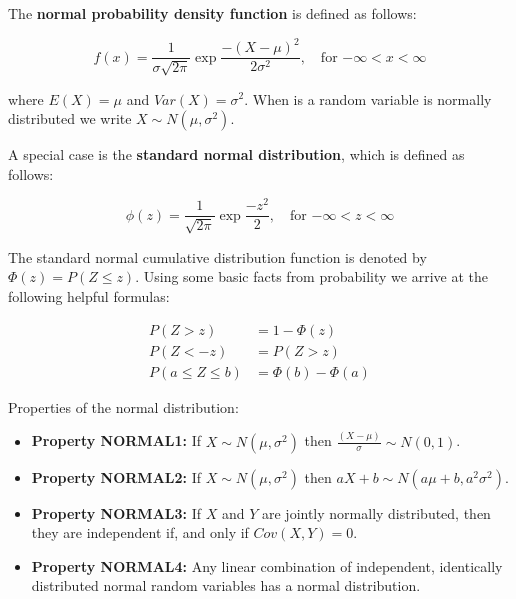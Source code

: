 \documentclass[11pt]{article}
\begin{document}
The \textbf{normal probability density function} is defined as follows:

\begin{equation*}
f(x) = \frac{1}{\sigma \sqrt{2\pi}} \exp{\frac{-(X-\mu)^{2}}{2\sigma^{2}}}, \quad \mbox{for $-\infty < x < \infty$}
\end{equation*}

where $E(X) = \mu$ and $Var(X) = \sigma^{2}$. When is a random variable is normally distributed we write 
$X \sim N(\mu, \sigma^{2})$.

\vspace{2mm}

A special case is the \textbf{standard normal distribution}, which is defined as follows:

\begin{equation*}
\phi(z) = \frac{1}{\sqrt{2\pi}} \exp{\frac{-z^{2}}{2}}, \quad \mbox{for $-\infty < z < \infty$} 
\end{equation*}

The standard normal cumulative distribution function is denoted by $\Phi(z) = P(Z \leq z)$. Using some basic 
facts from probability we arrive at the following helpful formulas:

\begin{align*}
P(Z > z)  &= 1 - \Phi(z) \\
P(Z < -z) &= P(Z > z) \\
P(a \leq Z \leq b) &= \Phi(b) - \Phi(a)
\end{align*}

\vspace{2mm}
\newpage

Properties of the normal distribution:

\begin{itemize}
 \item[] \textbf{Property NORMAL1:} If $X \sim N(\mu, \sigma^{2})$ then $\frac{(X - \mu)}{\sigma} \sim N(0, 1)$.
 \item[] \textbf{Property NORMAL2:} If $X \sim N(\mu, \sigma^{2})$ then $aX + b \sim N(a\mu + b, a^{2}\sigma^{2})$.
 \item[] \textbf{Property NORMAL3:} If $X$ and $Y$ are jointly normally distributed, then they are independent if, 
         and only if $Cov(X,Y) = 0$.
 \item[] \textbf{Property NORMAL4:} Any linear combination of independent, identically distributed normal random
         variables has a normal distribution.
\end{itemize}
\end{document}
